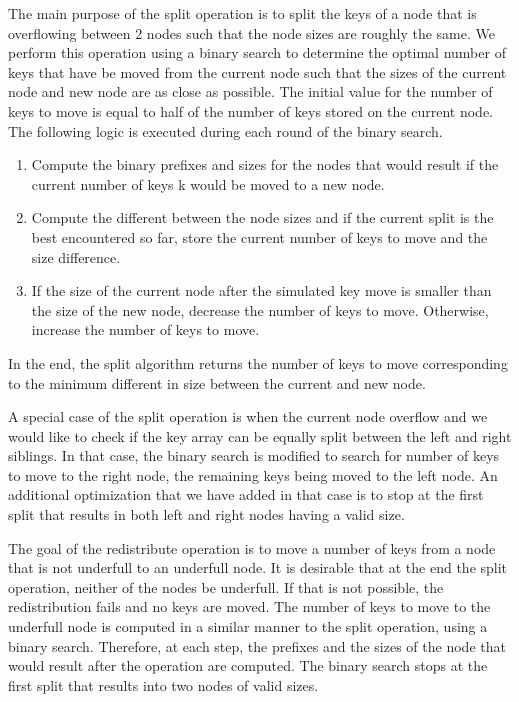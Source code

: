 \documentclass[11pt,a4paper,oneside]{article}
\begin{document}
The main purpose of the split operation is to split the keys of a node that is overflowing between 2 nodes such that the node sizes are roughly the same. We perform this operation using a binary search to determine the optimal number of keys that have be moved from the current node such that the sizes of the current node and new node are as close as possible. The initial value for the number of keys to move is equal to half of the number of keys stored on the current node. The following logic is executed during each round of the binary search. 
\begin{enumerate}
	\item Compute the binary prefixes and sizes for the nodes that would result if the current number of keys k would be moved to a 
	new node. 
	\item Compute the different between the node sizes and if the current split is the best encountered so far, store the current number of keys to move and the size difference.
	\item If the size of the current node after the simulated key move is smaller than the size of the new node, decrease the number of keys to move. Otherwise, increase the number of keys to move.
\end{enumerate}
In the end, the split algorithm returns the number of keys to move corresponding to the minimum different in size between the current and new node.

A special case of the split operation is when the current node overflow and we would like to check if the key array can be equally split between the left and right siblings. In that case, the binary search is modified to search for number of keys to move to the right node, the remaining keys being moved to the left node. An additional optimization that we have added in that case is to stop at the first split that results in both left and right nodes having a valid size.

The goal of the redistribute operation is to move a number of keys from a node that is not underfull to an underfull node. It is desirable that at the end the split operation, neither of the nodes be underfull. If that is not possible, the redistribution fails and no keys are moved. The number of keys to move to the underfull node is computed in a similar manner to the split operation, using a binary search. Therefore, at each step, the prefixes and the sizes of the node that would result after the operation are computed. The binary search stops at the first split that results into two nodes of valid sizes.
\end{document}
